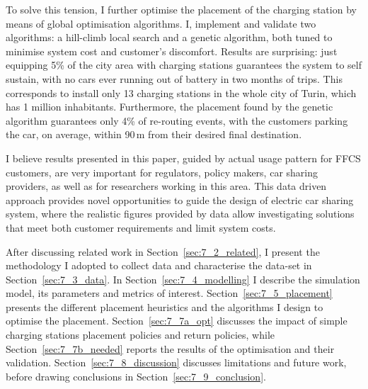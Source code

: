 To solve this tension, I further optimise the placement of the charging station by means of global optimisation algorithms. I, 
implement and validate two algorithms: a hill-climb local search and a genetic algorithm, both tuned to minimise system cost and customer's discomfort. 
Results are surprising: just equipping 5\% of the city area with charging stations guarantees the system to self sustain, with no cars ever running out of battery in two months of trips.
This corresponds to install only 13 charging stations in the whole city of Turin, which has 1 million inhabitants. 
Furthermore, the placement found by the genetic algorithm guarantees only 4\% of re-routing events, with the customers parking the car, on average, within 90\,m from their desired final destination.

I believe results presented in this paper, guided by actual usage pattern for FFCS customers, are very important for regulators, policy makers, car sharing providers, as well as for researchers working in this area. This data driven approach provides novel opportunities to guide the design of electric car sharing system, where the realistic figures provided by data allow investigating solutions that  meet both customer requirements and limit system costs. 

After discussing related work in Section~\ref{sec:7_2_related}, I present the methodology I adopted to collect data and characterise the data-set in Section~\ref{sec:7_3_data}.
 In  Section~\ref{sec:7_4_modelling} I describe the simulation model, its parameters and metrics of interest. Section~\ref{sec:7_5_placement} presents the different placement heuristics and the algorithms I design to optimise the placement.  Section~\ref{sec:7_7a_opt} discusses the impact of simple charging stations placement policies and return policies, while Section~\ref{sec:7_7b_needed} reports the results of the optimisation and their validation. Section~\ref{sec:7_8_discussion} discusses limitations and future work, before drawing conclusions in Section~\ref{sec:7_9_conclusion}.
